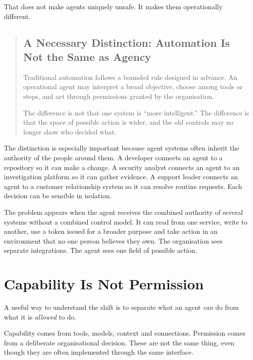 That does not make agents uniquely unsafe. It makes them operationally
different.

\begin{quote}
\subsection{A Necessary Distinction: Automation Is Not the Same as
Agency}\label{a-necessary-distinction-automation-is-not-the-same-as-agency}

Traditional automation follows a bounded rule designed in advance. An
operational agent may interpret a broad objective, choose among tools or
steps, and act through permissions granted by the organisation.

The difference is not that one system is ``more intelligent.'' The
difference is that the space of possible action is wider, and the old
controls may no longer show who decided what.
\end{quote}

The distinction is especially important because agent systems often
inherit the authority of the people around them. A developer connects an
agent to a repository so it can make a change. A security analyst
connects an agent to an investigation platform so it can gather
evidence. A support leader connects an agent to a customer relationship
system so it can resolve routine requests. Each decision can be sensible
in isolation.

The problem appears when the agent receives the combined authority of
several systems without a combined control model. It can read from one
service, write to another, use a token issued for a broader purpose and
take action in an environment that no one person believes they own. The
organisation sees separate integrations. The agent sees one field of
possible action.

\section{Capability Is Not
Permission}\label{capability-is-not-permission}

A useful way to understand the shift is to separate what an agent
\emph{can} do from what it is \emph{allowed} to do.

Capability comes from tools, models, context and connections. Permission
comes from a deliberate organisational decision. These are not the same
thing, even though they are often implemented through the same
interface.

